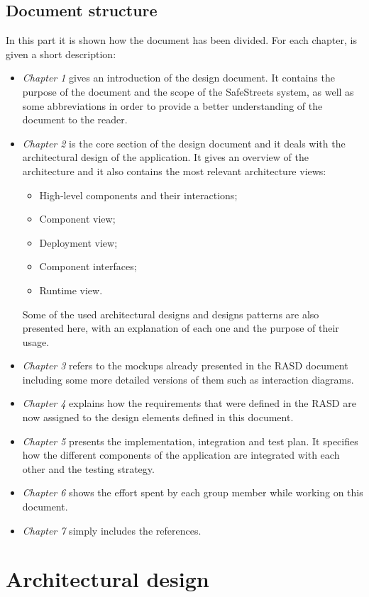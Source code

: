 \documentclass{article}
\begin{document}
		\subsection{Document structure}
			In this part it is shown how the document has been divided. For each chapter, is given a short description:
			\begin{itemize}
				\item \textit{Chapter 1} gives an introduction of the design document. It contains the purpose of the document and the scope of the SafeStreets system, as well as some abbreviations in order to provide a better understanding of the document to the reader.
				\item \textit{Chapter 2} is the core section of the design document and it deals with the architectural design of the application. It gives an overview of the architecture and it also contains the most relevant architecture views: 
				\begin{itemize}
					\item High‐level components and their interactions;
					\item Component view;
					\item Deployment view;
					\item Component interfaces;
					\item Runtime view. 
				\end{itemize}
			  	Some of the used architectural designs and designs patterns are also presented here, with an explanation of each one and the purpose of their usage.				
				\item \textit{Chapter 3} refers to the mockups already presented in the RASD document including some more detailed versions of them such as interaction diagrams.
				\item \textit{Chapter 4} explains how the requirements that were defined in the RASD are now assigned to the design elements defined in this document.
				\item \textit{Chapter 5} presents the implementation, integration and test plan. It specifies how the different components of the application are integrated with each other and the testing strategy.				
				\item \textit{Chapter 6} shows the effort spent by each group member while working on this document.
				\item \textit{Chapter 7} simply includes the references.
			\end{itemize}
		
	\clearpage
	\section{Architectural design}
\end{document}
